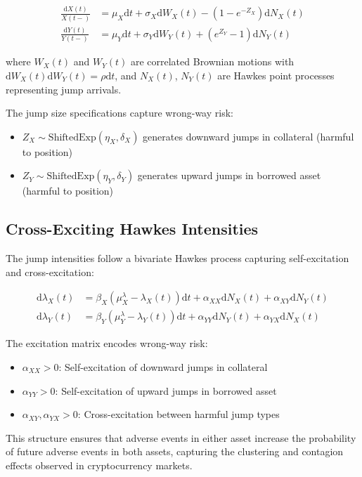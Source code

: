 \documentclass{article}
\newcommand{\diff}{\mathrm{d}}
\theoremstyle{definition}
\begin{document}
\begin{align}
\frac{\diff X(t)}{X(t-)} &= \mu_X \diff t + \sigma_X \diff W_X(t) - (1-e^{-Z_X}) \diff N_X(t) \label{eq:X_dynamics}\\
\frac{\diff Y(t)}{Y(t-)} &= \mu_Y \diff t + \sigma_Y \diff W_Y(t) + (e^{Z_Y}-1) \diff N_Y(t) \label{eq:Y_dynamics}
\end{align}

where $W_X(t)$ and $W_Y(t)$ are correlated Brownian motions with $\diff W_X(t) \diff W_Y(t) = \rho \diff t$, and $N_X(t)$, $N_Y(t)$ are Hawkes point processes representing jump arrivals.

The jump size specifications capture wrong-way risk:
\begin{itemize}
    \item $Z_X \sim \text{ShiftedExp}(\eta_X, \delta_X)$ generates downward jumps in collateral (harmful to position)
    \item $Z_Y \sim \text{ShiftedExp}(\eta_Y, \delta_Y)$ generates upward jumps in borrowed asset (harmful to position)
\end{itemize}

\subsection{Cross-Exciting Hawkes Intensities}

The jump intensities follow a bivariate Hawkes process capturing self-excitation and cross-excitation:

\begin{align}
\diff \lambda_X(t) &= \beta_X(\mu_X^\lambda - \lambda_X(t))\diff t + \alpha_{XX}\diff N_X(t) + \alpha_{XY}\diff N_Y(t) \label{eq:lambda_X}\\
\diff \lambda_Y(t) &= \beta_Y(\mu_Y^\lambda - \lambda_Y(t))\diff t + \alpha_{YY}\diff N_Y(t) + \alpha_{YX}\diff N_X(t) \label{eq:lambda_Y}
\end{align}

The excitation matrix encodes wrong-way risk:
\begin{itemize}
    \item $\alpha_{XX} > 0$: Self-excitation of downward jumps in collateral
    \item $\alpha_{YY} > 0$: Self-excitation of upward jumps in borrowed asset  
    \item $\alpha_{XY}, \alpha_{YX} > 0$: Cross-excitation between harmful jump types
\end{itemize}

This structure ensures that adverse events in either asset increase the probability of future adverse events in both assets, capturing the clustering and contagion effects observed in cryptocurrency markets.
\end{document}
